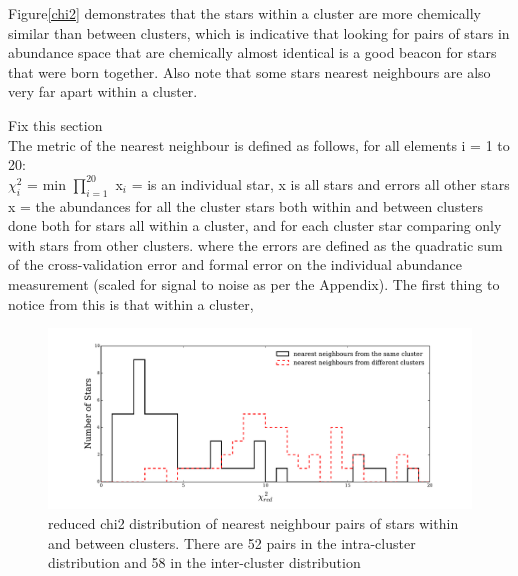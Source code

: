 \documentclass[14pt, preprint2]{aastex6}
\begin{document}
Figure\ref{chi2} demonstrates that the stars within a cluster are more chemically similar than between clusters, which is indicative that looking for pairs of stars in abundance space that are chemically almost identical is a good beacon for stars that were born together. Also note that some stars nearest neighbours are also very far apart within a cluster. 

Fix this section \\ 
The metric of the nearest neighbour is defined as follows, for all elements i = 1 to 20: \\
$\chi_i^2$ = min $ \prod_{i=1}^{20}$%
x$_i$ = is an individual star, x is all stars and errors all other stars \\
x = the abundances for all the cluster stars both within and between clusters
done both for stars all within a cluster, and for each cluster star comparing only with stars from other clusters.  
where the errors are defined as the quadratic sum of the cross-validation error and formal error on the individual abundance measurement (scaled for signal to noise as per the Appendix). 
The first thing to notice from this is that within a cluster, 


\begin{figure}[h!]
\includegraphics[scale=0.5]{chi2red.pdf} 
  \caption{reduced chi2 distribution of nearest neighbour pairs of stars within and between clusters. There are 52 pairs in the intra-cluster distribution and 58 in the inter-cluster distribution}
\label{fig:chi2}
\end{figure}
\end{document}
